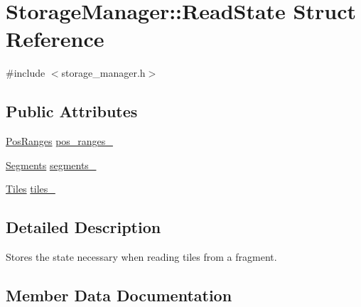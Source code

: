 \hypertarget{structStorageManager_1_1ReadState}{}\section{Storage\+Manager\+:\+:Read\+State Struct Reference}
\label{structStorageManager_1_1ReadState}


{\ttfamily \#include $<$storage\+\_\+manager.\+h$>$}

\subsection*{Public Attributes}
\begin{DoxyCompactItemize}
\item 
\hyperlink{classStorageManager_a118ac28e229231431d92b9993c28559d}{Pos\+Ranges} \hyperlink{structStorageManager_1_1ReadState_a0705f10a907f1d4b7b1f510ea3db3f06}{pos\+\_\+ranges\+\_\+}
\item 
\hyperlink{classStorageManager_ac40d6aec2ad9e7e4ecc7c765628dccb1}{Segments} \hyperlink{structStorageManager_1_1ReadState_a081db3c4d4e63810c2419e7fd731d0ef}{segments\+\_\+}
\item 
\hyperlink{classStorageManager_a2eb2f058a32a6279eaa277bcacdc663f}{Tiles} \hyperlink{structStorageManager_1_1ReadState_acf1541e41609d80545b309567267b519}{tiles\+\_\+}
\end{DoxyCompactItemize}


\subsection{Detailed Description}
Stores the state necessary when reading tiles from a fragment. 

\subsection{Member Data Documentation}
\hypertarget{structStorageManager_1_1ReadState_a0705f10a907f1d4b7b1f510ea3db3f06}{}
